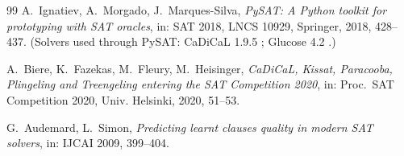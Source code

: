 \documentclass[11pt]{article}
\theoremstyle{remark}
\begin{document}
\begin{thebibliography}{99}
 A.~Ignatiev, A.~Morgado, J.~Marques-Silva,
\emph{PySAT: A Python toolkit for prototyping with SAT oracles}, in:
SAT 2018, LNCS 10929, Springer, 2018, 428--437. (Solvers used through
PySAT: CaDiCaL 1.9.5 \cite{cadical}; Glucose 4.2 \cite{glucose}.)

 A.~Biere, K.~Fazekas, M.~Fleury, M.~Heisinger,
\emph{CaDiCaL, Kissat, Paracooba, Plingeling and Treengeling entering
the SAT Competition 2020}, in: Proc.\ SAT Competition 2020, Univ.
Helsinki, 2020, 51--53.

 G.~Audemard, L.~Simon, \emph{Predicting learnt
clauses quality in modern SAT solvers}, in: IJCAI 2009, 399--404.

\end{thebibliography}
\end{document}

